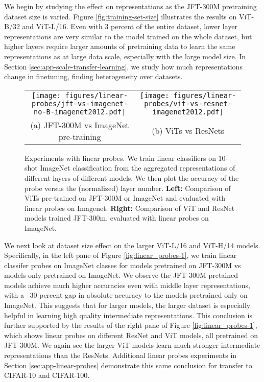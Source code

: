 \documentclass{article}
\begin{document}
We begin by studying the effect on representations as the JFT-300M pretraining dataset size is varied. Figure \ref{fig:training-set-size} illustrates the results on ViT-B/32 and ViT-L/16. Even with $3$ percent of the entire dataset, lower layer representations are very similar to the model trained on the whole dataset, but higher layers require larger amounts of pretraining data to learn the same representations as at large data scale, especially with the large model size. In Section \ref{sec:app-scale-transfer-learning}, we study how much representations change in finetuning, finding heterogeneity over datasets.  

\begin{figure}
    \centering
    \footnotesize
    \begin{tabular}{cc}
    \texttt{[image: figures/linear-probes/jft-vs-imagenet-no-B-imagenet2012.pdf]} &
    \texttt{[image: figures/linear-probes/vit-vs-resnet-imagenet2012.pdf]} \\
    (a) JFT-300M vs ImageNet pre-training &
    (b) ViTs vs ResNets
    \end{tabular}
    \caption{\small Experiments with linear probes. We train linear classifiers on 10-shot ImageNet classification from the aggregated representations of different layers of different models. We then plot the accuracy of the probe versus the (normalized) layer number. \textbf{Left:} Comparison of ViTs pre-trained on JFT-300M or ImageNet and evaluated with linear probes on Imagenet.
    \textbf{Right:} Comparison of ViT and ResNet models trained JFT-300m, evaluated with linear probes on ImageNet.}
    \label{fig:linear-probes-1}
    \vspace{-1em}
\end{figure}

We next look at dataset size effect on the larger ViT-L/16 and ViT-H/14 models. Specifically, in the left pane of Figure \ref{fig:linear_probes-1}, we train linear classifer probes on ImageNet classes for models pretrained on JFT-300M vs models only pretrained on ImageNet. We observe the JFT-300M pretained models achieve much higher accuracies even with middle layer representations, with a ~$30$ percent gap in absolute accuracy to the models pretrained only on ImageNet. This suggests that for larger models, the larger dataset is especially helpful in learning high quality intermediate representations. This conclusion is further supported by the results of the right pane of Figure \ref{fig:linear_probes-1}, which shows linear probes on different ResNet and ViT models, all pretrained on JFT-300M. We again see the larger ViT models learn much stronger intermediate representations than the ResNets. Additional linear probes experiments in Section \ref{sec:app-linear-probes} demonstrate this same conclusion for transfer to CIFAR-10 and CIFAR-100. 
\end{document}
